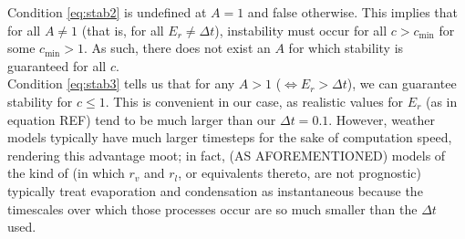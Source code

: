 \documentclass[11pt]{article}
\begin{document}
Condition \ref{eq:stab2} is undefined at $A=1$ and false otherwise. This implies that for all $A\neq 1$ (that is, for all $E_r\neq\Delta t$), instability must occur for all $c>c_{\text{min}}$ for some $c_{\text{min}}>1$. As such, there does not exist an $A$ for which stability is guaranteed for all $c$. \\
Condition \ref{eq:stab3} tells us that for any $A>1$ ($\Leftrightarrow E_r>\Delta t$), we can guarantee stability for $c\leq 1$. This is convenient in our case, as realistic values for $E_r$ (as in equation REF) tend to be much larger than our $\Delta t=0.1$. However, weather models typically have much larger timesteps for the sake of computation speed, rendering this advantage moot; in fact, (AS AFOREMENTIONED) models of the kind of \citet{Smith1990} (in which $r_v$ and $r_l$, or equivalents thereto, are not prognostic) typically treat evaporation and condensation as instantaneous because the timescales over which those processes occur are so much smaller than the $\Delta t$ used.
\end{document}
